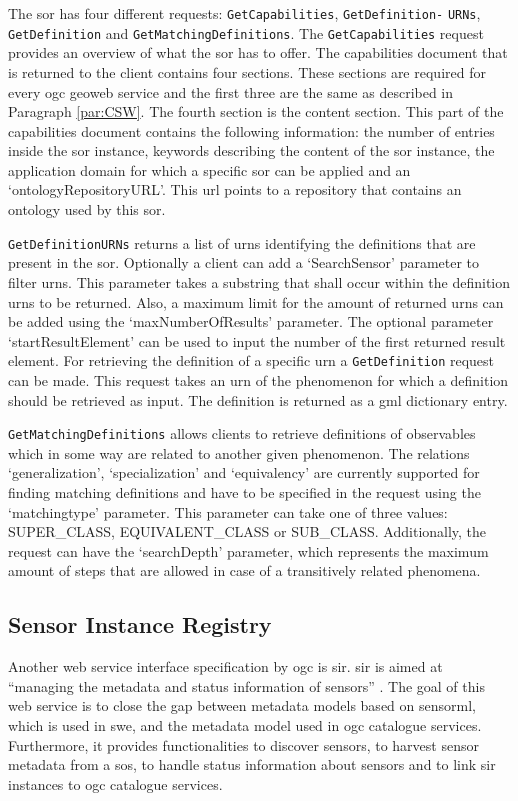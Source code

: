 The \ac{sor} has four different requests: \texttt{GetCapabilities}, \texttt{GetDefinition-} \texttt{URNs}, \texttt{GetDefinition} and \texttt{GetMatchingDefinitions}. The \texttt{GetCapabilities} request provides an overview of what the \ac{sor} has to offer. The capabilities document that is returned to the client contains four sections. These sections are required for every \ac{ogc} geoweb service and the first three are the same as described in Paragraph \ref{par:CSW}. The fourth section is the content section. This part of the capabilities document contains the following information: the number of entries inside the \ac{sor} instance, keywords describing the content of the \ac{sor} instance, the application domain for which a specific \ac{sor} can be applied and an `ontologyRepositoryURL'. This \ac{url} points to a repository that contains an ontology used by this \ac{sor}.

\texttt{GetDefinitionURNs} returns a list of \acp{urn} identifying the definitions that are present in the \ac{sor}. Optionally a client can add a `SearchSensor' parameter to filter \acp{urn}. This parameter takes a substring that shall occur within the definition \acp{urn} to be returned. Also, a maximum limit for the amount of returned \acp{urn} can be added using the `maxNumberOfResults' parameter. The optional parameter `startResultElement' can be used to input the number of the first returned result element. For retrieving the definition of a specific \ac{urn} a \texttt{GetDefinition} request can be made. This request takes an \ac{urn} of the phenomenon for which a definition should be retrieved as input. The definition is returned as a \ac{gml} dictionary entry. 

\texttt{GetMatchingDefinitions} allows clients to retrieve definitions of observables which in some way are related to another given phenomenon. The relations `generalization', `specialization' and `equivalency' are currently supported for finding matching definitions \citep{SW:OGC4} and have to be specified in the request using the `matchingtype' parameter. This parameter can take one of three values: SUPER\_CLASS, EQUIVALENT\_CLASS or SUB\_CLASS. Additionally, the request can have the `searchDepth' parameter, which represents the maximum amount of steps that are allowed in case of a transitively related phenomena.  

\subsection{Sensor Instance Registry}
Another web service interface specification by \ac{ogc} is \ac{sir}. \ac{sir} is aimed at \enquote{managing the metadata and status information of sensors} \cite[p. xii]{SW:OGC3}. The goal of this web service is to close the gap between metadata models based on \ac{sensorml}, which is used in \ac{swe}, and the metadata model used in \ac{ogc} catalogue services. Furthermore, it provides functionalities to discover sensors, to harvest sensor metadata from a \ac{sos}, to handle status information about sensors and to link \ac{sir} instances to \ac{ogc} catalogue services. 


